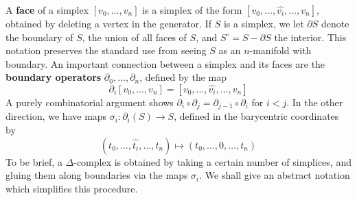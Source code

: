 A {\bf face} of a simplex $[v_0, \dots, v_n]$ is a simplex of the form $[v_0, \dots, \widehat{v_i}, \dots, v_n]$, obtained by deleting a vertex in the generator. If $S$ is a simplex, we let $\partial S$ denote the boundary of $S$, the union of all faces of $S$, and $S^\circ = S - \partial S$ the interior. This notation preserves the standard use from seeing $S$ as an $n$-manifold with boundary. An important connection between a simplex and its faces are the {\bf boundary operators} $\partial_0, \dots, \partial_n$, defined by the map
%
\[ \partial_i [v_0, \dots, v_n] = [v_0, \dots, \widehat{v_i}, \dots, v_n] \]
%
A purely combinatorial argument shows $\partial_i \circ \partial_j = \partial_{j-1} \circ \partial_i$ for $i < j$. In the other direction, we have maps $\sigma_i: \partial_i(S) \to S$, defined in the barycentric coordinates by
%
\[ (t_0, \dots, \widehat{t_i}, \dots, t_n) \mapsto (t_0, \dots, 0, \dots, t_n) \]
%
To be brief, a $\Delta$-complex is obtained by taking a certain number of simplices, and gluing them along boundaries via the maps $\sigma_i$. We shall give an abstract notation which simplifies this procedure.

